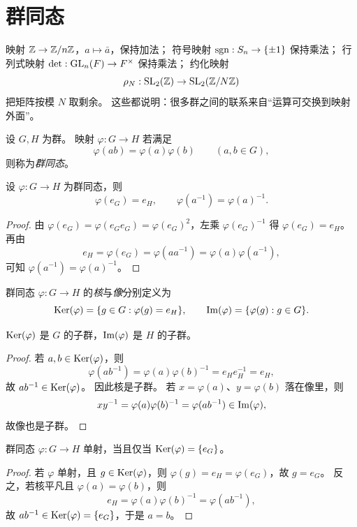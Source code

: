 \section{群同态}
\begin{example}[先看几个自然映射]
映射 $\mathbb{Z}\to \mathbb{Z}/n\mathbb{Z}$，$a\mapsto \bar a$，保持加法；
符号映射 $\operatorname{sgn}:S_n\to \{\pm1\}$ 保持乘法；
行列式映射 $\det:\mathrm{GL}_n(F)\to F^\times$ 保持乘法；
约化映射
\[ \rho_N:\mathrm{SL}_2(\mathbb{Z})\to \mathrm{SL}_2(\mathbb{Z}/N\mathbb{Z}) \]
把矩阵按模 $N$ 取剩余。
这些都说明：很多群之间的联系来自“运算可交换到映射外面”。
\end{example}
\begin{definition}
设 $G,H$ 为群。
映射 $\varphi:G\to H$ 若满足
\[ \varphi(ab)=\varphi(a)\varphi(b)\qquad (a,b\in G), \]
则称为\emph{群同态}。
\end{definition}
\begin{proposition}
设 $\varphi:G\to H$ 为群同态，则
\[ \varphi(e_G)=e_H,\qquad \varphi(a^{-1})=\varphi(a)^{-1}. \]
\end{proposition}
\begin{proof}
由 $\varphi(e_G)=\varphi(e_Ge_G)=\varphi(e_G)^2$，左乘 $\varphi(e_G)^{-1}$ 得 $\varphi(e_G)=e_H$。
再由
\[ e_H=\varphi(e_G)=\varphi(aa^{-1})=\varphi(a)\varphi(a^{-1}), \]
可知 $\varphi(a^{-1})=\varphi(a)^{-1}$。
\end{proof}
\begin{definition}
群同态 $\varphi:G\to H$ 的\emph{核}与\emph{像}分别定义为
\[ \mathrm{Ker}(\varphi)=\{g\in G:\varphi(g)=e_H\}, \qquad \mathrm{Im}(\varphi)=\{\varphi(g):g\in G\}. \]
\end{definition}
\begin{proposition}
$\mathrm{Ker}(\varphi)$ 是 $G$ 的子群，$\mathrm{Im}(\varphi)$ 是 $H$ 的子群。
\end{proposition}
\begin{proof}
若 $a,b\in \mathrm{Ker}(\varphi)$，则
\[ \varphi(ab^{-1})=\varphi(a)\varphi(b)^{-1}=e_He_H^{-1}=e_H, \]
故 $ab^{-1}\in \mathrm{Ker}(\varphi)$。
因此核是子群。
若 $x=\varphi(a)$、$y=\varphi(b)$ 落在像里，则
\[ xy^{-1}=\varphi(a)\varphi(b)^{-1}=\varphi(ab^{-1})\in \mathrm{Im}(\varphi), \]
故像也是子群。
\end{proof}
\begin{proposition}
群同态 $\varphi:G\to H$ 单射，当且仅当 $\mathrm{Ker}(\varphi)=\{e_G\}$。
\end{proposition}
\begin{proof}
若 $\varphi$ 单射，且 $g\in \mathrm{Ker}(\varphi)$，则 $\varphi(g)=e_H=\varphi(e_G)$，故 $g=e_G$。
反之，若核平凡且 $\varphi(a)=\varphi(b)$，则
\[ e_H=\varphi(a)\varphi(b)^{-1}=\varphi(ab^{-1}), \]
故 $ab^{-1}\in \mathrm{Ker}(\varphi)=\{e_G\}$，于是 $a=b$。
\end{proof}
